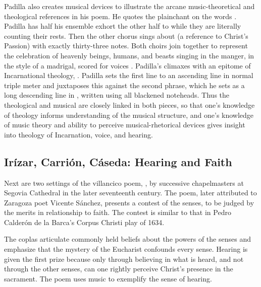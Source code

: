 Padilla also creates musical devices to illustrate the arcane music-theoretical and theological references in his poem.
He quotes the plainchant  on the words .
Padilla has half his ensemble exhort the other half to  while they are literally counting their rests.
Then the other chorus sings about  (a reference to Christ's Passion) with exactly thirty-three notes.
Both choirs join together to represent the celebration of heavenly beings, humans, and beasts singing in the manger, in the style of a madrigal, scored for voices .
Padilla's  climaxes with an epitome of Incarnational theology, .
Padilla sets the first line to an ascending line in normal triple meter and juxtaposes this against the second phrase, which he sets as a long descending line in , written using all blackened noteheads.
Thus the theological and musical are closely linked in both pieces, so that one's knowledge of theology informs understanding of the musical structure, and one's knowledge of music theory and ability to perceive musical-rhetorical devices gives insight into theology of Incarnation, voice, and hearing.

\subsection{Irízar, Carrión, Cáseda: Hearing and Faith}

Next are two settings of the villancico poem, , by successive chapelmasters at Segovia Cathedral in the later seventeenth century.
The poem, later attributed to Zaragoza poet Vicente Sánchez, presents a contest of the senses, to be judged by the merits in relationship to faith.
The contest is similar to that in Pedro Calderón de la Barca's Corpus Christi play  of 1634.

The coplas articulate commonly held beliefs about the powers of the senses and emphasize that the mystery of the Eucharist confounds every sense.
Hearing is given the first prize because only through believing in what is heard, and not through the other senses, can one rightly perceive Christ's presence in the sacrament.
The poem uses music to exemplify the sense of hearing.

